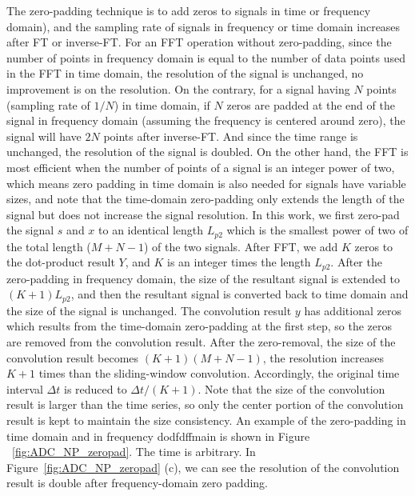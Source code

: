 The zero-padding technique is to add zeros to signals in time or frequency domain), and the sampling rate of signals in frequency or time domain increases after FT or inverse-FT. For an FFT operation without zero-padding, since the number of points in frequency domain is equal to the number of data points used in the FFT in time domain, the resolution of the signal is unchanged, \ie no improvement is on the resolution. On the contrary, for a signal having $N$ points (sampling rate of $1/N$) in time domain, if $N$ zeros are padded at the end of the signal in frequency domain (assuming the frequency is centered around zero), the signal will have $2N$ points after inverse-FT. And since the time range is unchanged, the resolution of the signal is doubled. On the other hand, the FFT is most efficient when the number of points of a signal is an integer power of two, which means zero padding in time domain is also needed for signals have variable sizes, and note that the time-domain zero-padding only extends the length of the signal but does not increase the signal resolution. In this work, we first zero-pad the signal $s$ and $x$ to an identical length $L_{p2}$ which is the smallest power of two of the total length ($M+N-1$) of the two signals. After FFT, we add $K$ zeros to the dot-product result $Y$, and $K$ is an integer times the length $L_{p2}$. After the zero-padding in frequency domain, the size of the resultant signal is extended to $(K+1)L_{p2}$, and then the resultant signal is converted back to time domain and the size of the signal is unchanged. The convolution result $y$ has additional zeros which results from the time-domain zero-padding at the first step, so the zeros are removed from the convolution result. After the zero-removal, the size of the convolution result becomes $(K+1)(M +N-1)$, \ie the resolution increases $K+1$ times than the sliding-window convolution. Accordingly, the original time interval $\Delta t$ is reduced to $\Delta t/(K+1)$. Note that the size of the convolution result is larger than the time series, so only the center portion of the convolution result is kept to maintain the size consistency. An example of the zero-padding in time domain and in frequency dodfdffmain is shown in Figure ~\ref{fig:ADC_NP_zeropad}. The time is arbitrary. In Figure~\ref{fig:ADC_NP_zeropad} (c), we can see the resolution of the convolution result is double after frequency-domain zero padding.
